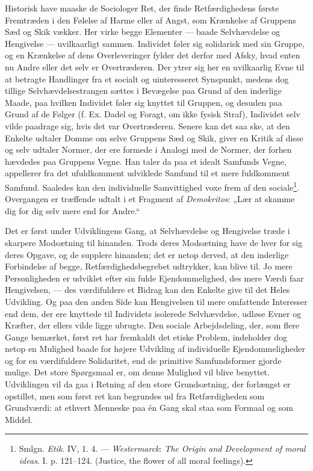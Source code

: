 \documentclass[12pt,a4paper]{book}
\newcommand{\opage}[1]{\marginnote{\footnotesize\textit{[#1]}}}
\begin{document}
Historisk have maaske de Sociologer Ret, der finde Retfærdighedens første Fremtræden i den
Følelse af Harme eller af Angst, som Krænkelse af Gruppens Sæd og Skik vækker. Her virke
begge Elementer --- baade Selvhævdelse og Hengivelse --- uvilkaarligt sammen. Individet
føler sig solidarisk med sin Gruppe, og en Krænkelse af dens Overleveringer fylder det
derfor med Afsky, hvad enten nu Andre eller det selv er Overtræderen. Der ytrer sig her en
uvilkaarlig Evne til at betragte Handlinger fra et socialt og uinteresseret Synspunkt,
medens dog tillige Selvhævdelsestrangen sættes i Bevægelse paa Grund af den inderlige
Maade, paa hvilken Individet føler sig knyttet til Gruppen, og desuden paa Grund af de
Følger (f. Ex. Dadel og Foragt, om ikke fysisk Straf), Individet selv vilde paadrage sig,
hvis det var Overtræderen. Senere kan det saa ske, at den Enkelte udtaler Domme om selve
Gruppens Sæd og Skik, giver en Kritik af disse og selv udtaler Normer, der ere formede i
Analogi med de Normer, der forhen hævdedes paa Gruppens Vegne. Han taler da paa et idealt
Samfunds Vegne, appellerer fra det ufuldkomment udviklede Samfund til et mere fuldkomment
Samfund. Saaledes kan den
\opage{367}individuelle Samvittighed voxe frem af den
sociale\footnote{Smlgn. \emph{Etik}. IV, 1. 4. --- \emph{Westermarck}: \emph{The Origin and
Development of moral ideas}. I. p. 121--124. (Justice, the flower of all moral feelings).}.
Overgangen er træffende udtalt i et Fragment af \emph{Demokritos}: „Lær at skamme dig for
dig selv mere end for Andre.“

Det er først under Udviklingens Gang, at Selvhævdelse og Hengivelse træde i skarpere
Modsætning til hinanden. Trods deres Modsætning have de hver for sig deres Opgave, og de
supplere hinanden; det er netop derved, at den inderlige Forbindelse af begge,
Retfærdighedsbegrebet udtrykker, kan blive til. Jo mere Personligheden er udviklet efter
sin fulde Ejendommelighed, des mere Værdi faar Hengivelsen, --- des værdifuldere et Bidrag
kan den Enkelte give til det Heles Udvikling. Og paa den anden Side kan Hengivelsen til
mere omfattende Interesser end dem, der ere knyttede til Individets isolerede Selvhævdelse,
udløse Evner og Kræfter, der ellers vilde ligge ubrugte. Den sociale Arbejdsdeling, der,
som flere Gange bemærket, først ret har fremkaldt det etiske Problem, indeholder dog netop
en Mulighed baade for højere Udvikling af individuelle Ejendommeligheder og for en
værdifuldere Solidaritet, end de primitive Samfundsformer gjorde mulige. Det store
Spørgsmaal er, om denne Mulighed vil blive benyttet. Udviklingen vil da gaa i Retning af
den store Grundsætning, der forlængst er opstillet, men som først ret kan begrundes ud fra
Retfærdigheden som Grundværdi: at ethvert Menneske paa én Gang skal staa som Formaal og som
Middel.
\end{document}
